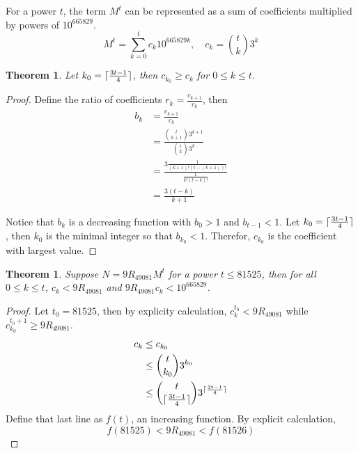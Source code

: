 \documentclass{amsart}
\newcommand{\RE}{{49081}}
\newcommand{\ME}{{665829}}
\DeclarePairedDelimiter\ceil{\lceil}{\rceil}
\numberwithin{equation}{section}
\theoremstyle{plain} %
\newtheorem{thm}[equation]{Theorem}
\theoremstyle{definition}
\theoremstyle{remark}
\begin{document}
 For a power $t$, the term $M^t$ can be represented as a sum of coefficients multiplied by powers of $10^\ME$.
$$M^t = \sum_{k = 0}^t c_k  10^{\ME k}, \quad c_k = \binom{t}{k} 3^k $$
\begin{thm} Let $k_0 =  \ceil{\frac{3t-1}{4}}$, then $c_{k_0} \geq c_k$ for $0 \leq k \leq t$.
\end{thm}
\begin{proof}
Define the ratio of coefficients $r_k = \frac{c_{k+1}}{c_k}$, then 
\begin{align*}
b_k &=  \frac{c_{k+1}}{c_k}\\
&= \frac{ \binom{t}{k+1} 3^{k+1}}{ \binom{t}{k} 3^k}\\
&=  \frac{3  \frac{1}{(k+1)! (t - (k+1))!}}{\frac{1}{k! (t - k)!}}\\
&= \frac{ 3(t-k)}{k + 1}
\end{align*}

Notice that $b_k$ is a decreasing function with $b_0 > 1$ and $b_{t-1} < 1$. Let $k_0 = \ceil{\frac{3t-1}{4}}$, then $k_0$ is the minimal integer so that $b_{k_0} < 1$. Therefor, $c_{k_0}$ is the coefficient with largest value.
\end{proof}
\begin{thm}Suppose $N = 9 R_{49081} M^t$ for a power $t \leq 81525$, then for all $0 \leq k \leq t$,  $c_k < 9R_{\RE}$ and $9 R_{\RE} c_k < 10^\ME$.
\end{thm}
\begin{proof}
Let $t_0 =81525$, then by explicity calculation, $c^{t_0}_{k} < 9 R_\RE$ while $c^{t_0 + 1}_{k_0} \geq  9 R_\RE$.
\begin{align*}
c_k & \leq c_{k_0} \\
& \leq \binom{t}{k_0} 3^{k_0}\\
& \leq \binom{t}{\ceil{\frac{3t-1}{4}}} 3^{\ceil{\frac{3t-1}{4}}}\\
\end{align*}
Define that last line as $f(t)$, an increasing function. By explicit calculation,$$f(81525) < 9R_\RE < f(81526) $$
\end{proof}
\end{document}
